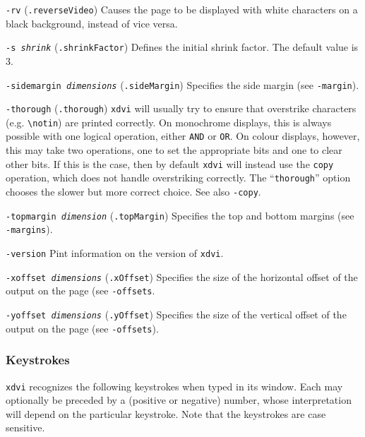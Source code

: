 \begin{list}
\item[\tt-rv]
({\tt .reverseVideo})
Causes the page to be displayed with white characters on a
black background, instead of vice versa.

\item[\tt-s \em shrink]
({\tt .shrinkFactor})
Defines the initial shrink factor.  The default value is 3.

\item[\tt-sidemargin \em dimensions]
({\tt .sideMargin})
Specifies the side margin (see {\tt -margin}).

\item[\tt-thorough]
({\tt .thorough})
\verb+xdvi+ will usually try to ensure that overstrike characters (e.g.
\verb+\notin+) are printed correctly.  On monochrome displays, this is always
possible with one logical operation, either {\tt AND} or {\tt OR}.  On
colour displays, however, this may take two operations, one to set the
appropriate bits and one to clear other bits.  If this is the case, then
by default \verb+xdvi+ will instead use the {\tt copy} operation,
which does not handle overstriking correctly.  The ``{\tt thorough}'' option
chooses the slower but more correct choice.  See also {\tt-copy}.

\item[\tt-topmargin \em dimension]
({\tt .topMargin})
Specifies the top and bottom margins (see {\tt-margins}).

\item[\tt-version]
Pint information on the version of \verb+xdvi+.

\item[\tt-xoffset \em dimensions]
({\tt .xOffset})
Specifies the size of the horizontal offset of the output on the page (see
{\tt-offsets}.

\item[\tt-yoffset \em dimensions]
({\tt .yOffset})
Specifies the size of the vertical   offset of the output on the page (see
{\tt-offsets}).

\end{list}


\subsubsection{Keystrokes}
\label{se:dvixdvikeys}

\verb+xdvi+ recognizes the following keystrokes when typed in its window.
Each may optionally be preceded by a (positive or negative) number, whose
interpretation will depend on the particular keystroke. Note that the
keystrokes are case sensitive.


